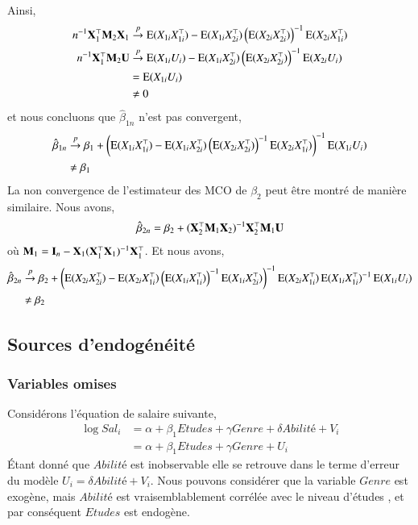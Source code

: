 \documentclass[10pt, reqno]{amsart}
\begin{document}
	Ainsi,
	\begin{align*}
	n^{-1}\mathbf X_1^\top\mathbf M_2\mathbf X_1 &\overset{p}{\rightarrow} \operatorname{E}(X_{1i}X_{1i}^\top)-\operatorname{E}(X_{1i}X_{2i}^\top)\left( \operatorname{E}(X_{2i}X_{2i}^\top)\right)^{-1}\operatorname{E}(X_{2i}X_{1i}^\top)\\
	n^{-1}\mathbf X_1^\top\mathbf M_2\mathbf U &\overset{p}{\rightarrow} \operatorname{E}(X_{1i}U_i) - \operatorname{E}(X_{1i}X_{2i}^\top)\left( \operatorname{E}(X_{2i}X_{2i}^\top)\right)^{-1}\operatorname{E}(X_{2i}U_i)\\
	&=\operatorname{E}(X_{1i}U_i) \\
	&\neq 0
	\end{align*}
	et nous concluons que $\hat{\beta}_{1n} $ n'est pas convergent,
	\begin{align*}
	\hat{\beta}_{1n} &\overset{p}{\rightarrow} \beta_1 + \left(\operatorname{E}(X_{1i}X_{1i}^\top)-\operatorname{E}(X_{1i}X_{2i}^\top)\left( \operatorname{E}(X_{2i}X_{2i}^\top)\right)^{-1}\operatorname{E}(X_{2i}X_{1i}^\top)\right)^{-1}\operatorname{E}(X_{1i}U_i)\\
	&\neq \beta_1
	\end{align*}
	La non convergence de l'estimateur des MCO de $\beta_2$ peut être montré de manière similaire. Nous avons,
	\begin{align*}
	\hat{\beta}_{2n} = \beta_2 + (\mathbf X_2^\top\mathbf M_1\mathbf X_2)^{-1}\mathbf X_2^\top\mathbf M_1\mathbf U
	\end{align*}
	où $\mathbf M_1 = \mathbf{I}_n - \mathbf X_1(\mathbf X_1^\top\mathbf X_1)^{-1}\mathbf X_1^\top$. Et nous avons,
	\begin{align*}
	\hat{\beta}_{2n}  &\overset{p}{\rightarrow} \beta_2 + \left(\operatorname{E}(X_{2i}X_{2i}^\top)-\operatorname{E}(X_{2i}X_{1i}^\top)\left( \operatorname{E}(X_{1i}X_{1i}^\top)\right)^{-1}\operatorname{E}(X_{1i}X_{2i}^\top)\right)^{-1}\operatorname{E}(X_{2i}X_{1i}^\top)\operatorname{E}(X_{1i}X_{1i}^\top)^{-1}\operatorname{E}(X_{1i}U_i)\\
	&\neq \beta_2
	\end{align*}

\subsection{Sources d'endogénéité}
\subsubsection*{Variables omises}
Considérons l'équation de salaire suivante,
\begin{align*}
\log Sal_i &= \alpha + \beta_1Etudes + \gamma Genre + \delta Abilité + V_i\\
&=\alpha + \beta_1Etudes + \gamma Genre + U_i
\end{align*}
\'Etant donné que $Abilité$ est inobservable elle se retrouve dans le terme d'erreur du modèle $U_i = \delta Abilité + V_i$. Nous pouvons considérer que la variable $Genre$ est exogène, mais $Abilité$ est vraisemblablement corrélée avec le niveau d'études , et par conséquent $Etudes$ est endogène.
\end{document}

